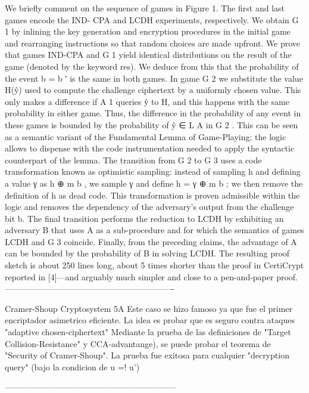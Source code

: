 \documentclass[runningheads,a4paper]{llncs}
\begin{document}
We briefly comment on the sequence of games in Figure 1. The first and last games encode the IND-
CPA and LCDH experiments, respectively. We obtain G 1 by inlining the key generation and encryption
procedures in the initial game and rearranging instructions so that random choices are made upfront.
We prove that games IND-CPA and G 1 yield identical distributions on the result of the game (denoted
by the keyword res). We deduce from this that the probability of the event b = b ′ is the same in both
games.
In game G 2 we substitute the value H(ŷ) used to compute the challenge ciphertext by a uniformly
chosen value. This only makes a difference if A 1 queries ŷ to H, and this happens with the same probability in either game. Thus, the difference in the probability of any event in these games is
bounded by the probability of ŷ ∈ L A in G 2 . This can be seen as a semantic variant of the Fundamental
Lemma of Game-Playing; the logic allows to dispense with the code instrumentation needed to apply
the syntactic counterpart of the lemma.
The transition from G 2 to G 3 uses a code transformation known as optimistic sampling: instead of
sampling h and defining a value γ as h ⊕ m b , we sample γ and define h = γ ⊕ m b ; we then remove the
definition of h as dead code. This transformation is proven admissible within the logic and removes
the dependency of the adversary’s output from the challenge bit b.
The final transition performs the reduction to LCDH by exhibiting an adversary B that uses A
as a sub-procedure and for which the semantics of games LCDH and G 3 coincide. Finally, from the
preceding claims, the advantage of A can be bounded by the probability of B in solving LCDH. The
resulting proof sketch is about 250 lines long, about 5 times shorter than the proof in CertiCrypt
reported in [4]—and arguably much simpler and close to a pen-and-paper proof.
-------------------------------------------------------------

Cramer-Shoup Cryptosystem 5A
\cite{article5}
Este caso se hizo famoso ya que fue el primer encriptador asimetrico eficiente. La idea es probar que es seguro contra ataques "adaptive chosen-ciphertext"
Mediante la prueba de las definiciones de "Target Collision-Resistance" y CCA-advantange), se puede probar el teorema de "Security of Cramer-Shoup".
La prueba fue exitosa para cualquier "decryption query" (bajo la condicion de u =! u')

--------------------------------------------------------------
\end{document}
